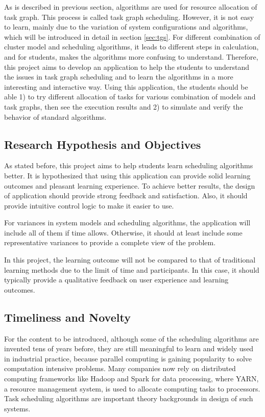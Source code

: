 \documentclass[a4paper,11pt]{article}
\begin{document}
As is described in previous section, algorithms are used for resource allocation of task graph. This process is called task graph scheduling. However, it is not easy to learn, mainly due to the variation of system configurations and algorithms, which will be introduced in detail in section \ref{sec:tgs}. For different combination of cluster model and scheduling algorithms, it leads to different steps in calculation, and for students, makes the algorithms more confusing to understand. Therefore, this project aims to develop an application to help the students to understand the issues in task graph scheduling and to learn the algorithms in a more interesting and interactive way.  Using this application, the students should be able 1) to try different allocation of tasks for various combination of models and task graphs, then see the execution results and 2) to simulate and verify the behavior of standard algorithms.

\subsection{Research Hypothesis and Objectives} \label{sec:obj}

As stated before, this project aims to help students learn scheduling algorithms better. It is hypothesized that using this application can provide solid learning outcomes and pleasant learning experience. To achieve better results, the design of application should provide strong feedback and satisfaction. Also, it should provide intuitive control logic to make it easier to use.

For variances in system models and scheduling algorithms, the application will include all of them if time allows. Otherwise, it should at least include some representative variances to provide a complete view of the problem.

In this project, the learning outcome will not be compared to that of traditional learning methods due to the limit of time and participants. In this case, it should typically provide a qualitative feedback on user experience and learning outcomes.

\subsection{Timeliness and Novelty}

For the content to be introduced, although some of the scheduling algorithms are invented tens of years before, they are still meaningful to learn and widely used in industrial practice, because parallel computing is gaining popularity to solve computation intensive problems. Many companies now rely on distributed computing frameworks like Hadoop and Spark for data processing, where YARN, a resource management system, is used to allocate computing tasks to processors. Task scheduling algorithms are important theory backgrounds in design of such systems. 
\end{document}
